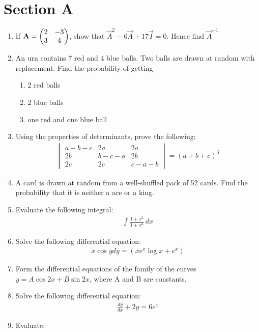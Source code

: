 \documentclass[journal,12pt,twocolumn]{IEEEtran}
\renewcommand\thesection{\arabic{section}}
\begin{document}
\section{Section A}
\renewcommand{\theequation}{\theenumi}
\begin{enumerate}[label=\thesection.\arabic*.,ref=\thesection.\theenumi]
\item If $\mathbf{A} =\begin{pmatrix}2&-3\\3&4\end{pmatrix}$, show that $\vec{A}^2 - 6\vec{A} + 17\vec{I} = 0$. Hence find $\vec{A}^{-1}$
\item An urn contains 7 red and 4 blue balls. Two balls are drawn at random with replacement. Find the probability of getting
\begin{enumerate}
\item 2 red balls
\item 2 blue balls
\item one red and one blue ball
\end{enumerate} 
\item Using the properties of determinants, prove the following:
\begin{align}
\begin{vmatrix}
a-b-c & 2a& 2a\\ 2b& b-c-a& 2b\\2c&2c&c-a-b 
\end{vmatrix}
= (a+b+c)^3 \nonumber
\end{align}
\item A card is drawn at random from a well-shuffled pack of 52 cards. Find the probability that it is neither a ace or a king.
\item Evaluate the following integral:
\begin{align}
 \int \displaystyle\frac{1+x^2}{1+x^4}\,dx \nonumber
\end{align}
\item Solve the following differential equation:
\begin{align}
x \cos y dy=(xe^x\log x + e^x) \nonumber
\end{align}
\item Form the differential equations of the family of the curves $y = A\cos 2x + B\sin 2x$, where A and B are constants.
\item Solve the following differential equation:
\begin{align}
   \displaystyle\frac{dy}{dx} + 2y = 6e^x \nonumber
\end{align}
\item Evaluate:

\end{enumerate}
\end{document}
